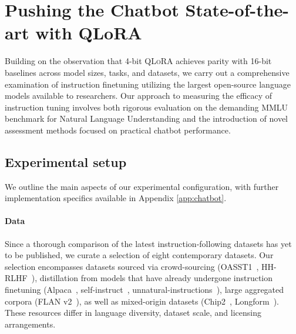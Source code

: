 \section{Pushing the Chatbot State-of-the-art with QLoRA}
\label{sec:pushing}
Building on the observation that 4-bit \textsc{QLoRA} achieves parity with 16-bit baselines across model sizes, tasks, and datasets, we carry out a comprehensive examination of instruction finetuning utilizing the largest open-source language models available to researchers. Our approach to measuring the efficacy of instruction tuning involves both rigorous evaluation on the demanding MMLU benchmark for Natural Language Understanding and the introduction of novel assessment methods focused on practical chatbot performance.

\subsection{Experimental setup} We outline the main aspects of our experimental configuration, with further implementation specifics available in Appendix \ref{app:chatbot}. 

\paragraph{Data} Since a thorough comparison of the latest instruction-following datasets has yet to be published, we curate a selection of eight contemporary datasets. Our selection encompasses datasets sourced via crowd-sourcing (OASST1~\citep{kopf2023openassistant}, HH-RLHF~\citep{bai2022training}), distillation from models that have already undergone instruction finetuning (Alpaca~\citep{alpaca}, self-instruct~\citep{wang2022self}, unnatural-instructions~\citep{honovich2022unnatural}), large aggregated corpora (FLAN v2~\citep{chung2022scaling}), as well as mixed-origin datasets (Chip2~\citep{laion2023}, Longform~\citep{koksal2023longform}). These resources differ in language diversity, dataset scale, and licensing arrangements.

